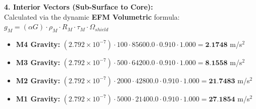 \documentclass[11pt, a4paper]{article}
\begin{document}
  \vspace{0.5em}
  \noindent \textbf{4. Interior Vectors (Sub-Surface to Core):} \\[0.5em]
  \hspace*{1em} Calculated via the dynamic \textbf{EFM Volumetric} formula: $g_M = (\alpha G) \cdot \rho_{M} \cdot R_M \cdot \tau_M \cdot \Omega_{shield}$
  \begin{itemize}
    \item \textbf{M4 Gravity:} $(2.792 \times 10^{-7}) \cdot 100 \cdot 85600.0 \cdot 0.910 \cdot 1.000 = \textbf{2.1748}$ m/s$^2$
    \item \textbf{M3 Gravity:} $(2.792 \times 10^{-7}) \cdot 500 \cdot 64200.0 \cdot 0.910 \cdot 1.000 = \textbf{8.1558}$ m/s$^2$
    \item \textbf{M2 Gravity:} $(2.792 \times 10^{-7}) \cdot 2000 \cdot 42800.0 \cdot 0.910 \cdot 1.000 = \textbf{21.7483}$ m/s$^2$
    \item \textbf{M1 Gravity:} $(2.792 \times 10^{-7}) \cdot 5000 \cdot 21400.0 \cdot 0.910 \cdot 1.000 = \textbf{27.1854}$ m/s$^2$
  \end{itemize}
\end{document}
